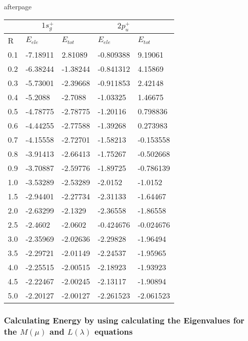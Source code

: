afterpage{
  \captionsetup{type=figure}
  \label{tab:H2Plus2D}
  \begin{tabular}{ |l|l|l|l|l| }
      \hline
      \multicolumn{1}{r}{} &
      \multicolumn{1}{r}{ $ 1s_g^+ $} &
      \multicolumn{1}{r}{} &
      \multicolumn{1}{r}{$ 2p_u^+ $ } \\
      \hline
      R & $ E_{ele} $ & $ E_{tot} $ & $ E_{ele} $ & $ E_{tot} $  \\ 
      0.1 & -7.18911 & 2.81089 & -0.809388 & 9.19061 \\
      0.2 & -6.38244 & -1.38244 & -0.841312 & 4.15869\\
      0.3 & -5.73001 & -2.39668 & -0.911853 & 2.42148 \\
      0.4 & -5.2088 & -2.7088 & -1.03325 &  1.46675\\
      0.5 & -4.78775 & -2.78775 & -1.20116 & 0.798836 \\
      0.6 & -4.44255 & -2.77588 & -1.39268 & 0.273983\\
      0.7 & -4.15558 & -2.72701 & -1.58213 & -0.153558 \\
      0.8 & -3.91413 & -2.66413 & -1.75267 & -0.502668 \\
      0.9 & -3.70887 & -2.59776 & -1.89725 & -0.786139\\
      1.0 & -3.53289 & -2.53289 & -2.0152 & -1.0152 \\
      1.5 & -2.94401 & -2.27734 & -2.31133 & -1.64467\\
      2.0 & -2.63299 & -2.1329 & -2.36558 & -1.86558 \\
      2.5 & -2.4602 & -2.0602 & -0.424676 & -0.024676\\
      3.0 & -2.35969 & -2.02636 & -2.29828 & -1.96494 \\
      3.5 & -2.29721 & -2.01149 & -2.24537 & -1.95965 \\
      4.0 & -2.25515 & -2.00515 & -2.18923 & -1.93923 \\
      4.5 & -2.22467 & -2.00245 & -2.13117 & -1.90894 \\
      5.0 & -2.20127 & -2.00127 & -2.261523 & -2.061523 \\
      \hline 
  \end{tabular}
}

\subsubsection{Calculating Energy by using calculating the Eigenvalues for the $ M(\mu) $ and $ L(\lambda) $ equations }

